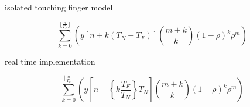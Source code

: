 \documentclass{sigchi}
\begin{document}
isolated touching finger model

\begin{equation}
	\sum_{k=0}^{\lfloor \frac{n}{T_F} \rfloor}\left(y[n + k(T_N-T_F)]\binom{m+k}{k} (1 - \rho)^{k} \rho^m\right)
\end{equation}

% 

real time implementation

\begin{equation}
	\sum_{k=0}^{\lfloor \frac{n}{T_F} \rfloor}\left(y[n - \left\{ k\frac{T_F}{T_N}\right\} T_N] \binom{m+k}{k} (1 - \rho)^{k} \rho^m\right)
\end{equation}





\end{document}
